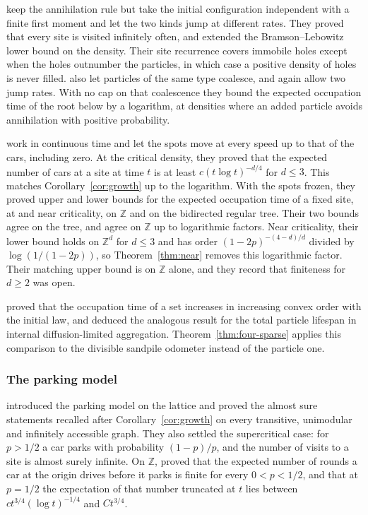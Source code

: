 \documentclass[11pt]{amsart}
\theoremstyle{plain}
\theoremstyle{definition}
\newcommand{\Z}{\mathbb{Z}}
\begin{document}
\citet{CRS} keep the annihilation rule but take the initial configuration
independent with a finite first moment and let the two kinds jump at different
rates. They proved that every site is visited infinitely often, and extended the Bramson--Lebowitz lower bound
on the density. Their site recurrence covers immobile holes except when the
holes outnumber the particles, in which case a positive density of holes is
never filled. \citet{AJLRS} also let particles of the same type coalesce, and again allow
two jump rates. With no cap on that coalescence they bound the expected
occupation time of the root below by a logarithm, at densities where an added
particle avoids annihilation with positive probability.

\citet{JJLS} work in continuous time and let the spots move at every speed up
to that of the cars, including zero. At the critical density, they proved that
the expected number of cars at a site at time $t$ is at least
$c(t\log t)^{-d/4}$ for $d\leq3$. This matches Corollary~\ref{cor:growth} up to
the logarithm. With the spots frozen, they proved upper and lower bounds for
the expected occupation time of a fixed site, at and near criticality, on $\Z$ and
on the bidirected regular tree. Their two bounds agree on the tree, and agree on
$\Z$ up to logarithmic factors. Near criticality, their lower bound holds on
$\Z^d$ for $d\leq3$ and has order $(1-2p)^{-(4-d)/d}$ divided by
$\log(1/(1-2p))$, so Theorem~\ref{thm:near} removes this logarithmic factor. Their matching
upper bound is on $\Z$ alone, and they record that finiteness for $d\geq2$ was
open.

\citet{BBJJ} proved that the occupation time of a set increases in increasing
convex order with the initial law, and deduced the analogous result for the
total particle lifespan in internal diffusion-limited aggregation.
Theorem~\ref{thm:four-sparse} applies this comparison to the divisible sandpile
odometer instead of the particle one.

\subsubsection{The parking model}

\citet{DGJLS} introduced the parking model on the lattice and proved the
almost sure statements recalled after Corollary~\ref{cor:growth} on every
transitive, unimodular and infinitely accessible graph. They also settled the
supercritical case: for $p>1/2$ a car parks with probability $(1-p)/p$, and the
number of visits to a site is almost surely infinite. On $\Z$, \citet{PRS}
proved that the expected number of rounds a car at the origin drives before it parks is finite for every $0<p<1/2$, and that at $p=1/2$ the expectation of that number truncated at $t$ lies between $ct^{3/4}(\log t)^{-1/4}$ and
$Ct^{3/4}$.
\end{document}

